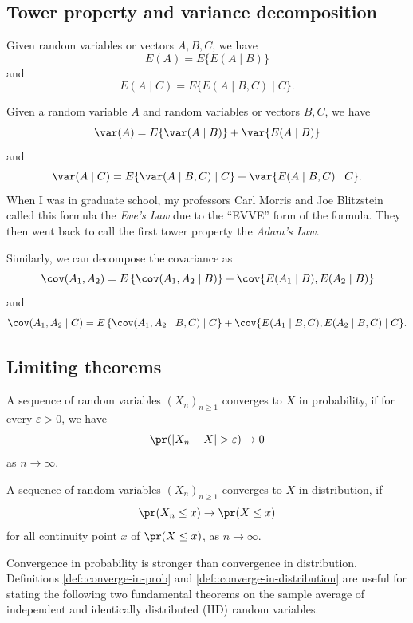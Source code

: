  



\subsection{Tower property and variance decomposition}\label{appendix::tower-property}

Given random variables or vectors $A, B, C$, we have
$$
E(A) = E\{   E(A \mid B) \} 
$$
and
$$
E(A\mid C) = E\{   E(A \mid B, C) \mid C \}. 
$$

 
Given a random variable $A$ and random variables or vectors $B, C$, we have
$$
\var(A) = E\{   \var(A \mid B) \}  +  \var\{   E(A \mid B) \} 
$$
and
$$
\var(A\mid C) = E\{   \var(A \mid B, C)  \mid C \}  +  \var\{   E(A \mid B, C)\mid C \}  .
$$
When I was in graduate school, my professors Carl Morris and Joe Blitzstein called this formula the {\it Eve's Law} due to the ``EVVE'' form of the formula. They then went back to call the first tower property the {\it Adam's Law.}



Similarly, we can decompose the covariance as
$$
\cov(A_1, A_2) = E\left\{ \cov(A_1, A_2\mid B)   \right\} + \cov\{ E(A_1\mid B), E(A_2\mid B)  \}
$$
and
$$
\cov(A_1, A_2\mid C) = E\left\{ \cov(A_1, A_2\mid B, C)  \mid C \right\} + \cov\{ E(A_1\mid B, C), E(A_2\mid B, C) \mid C  \}.
$$


\subsection{Limiting theorems}


\begin{definition}
\label{def::converge-in-prob}
A sequence of random variables $(X_n)_{n\geq 1}$ converges to $X$ in probability, if for every $\varepsilon > 0$, we have
$$
\pr (   |X_n - X| > \varepsilon  ) \rightarrow 0
$$
as $n\rightarrow \infty$. 
\end{definition}



\begin{definition}
\label{def::converge-in-distribution}
A sequence of random variables $(X_n)_{n\geq 1}$ converges to $X$ in distribution, if 
$$
\pr(X_n \leq x) \rightarrow \pr(X\leq x)
$$
for all continuity point $x$ of $ \pr(X\leq x) $, as $n\rightarrow \infty$. 
\end{definition}


Convergence in probability is stronger than convergence in distribution. Definitions \ref{def::converge-in-prob} and \ref{def::converge-in-distribution} are useful for stating the following two fundamental theorems on the sample average of independent and identically distributed (IID) random variables. 



